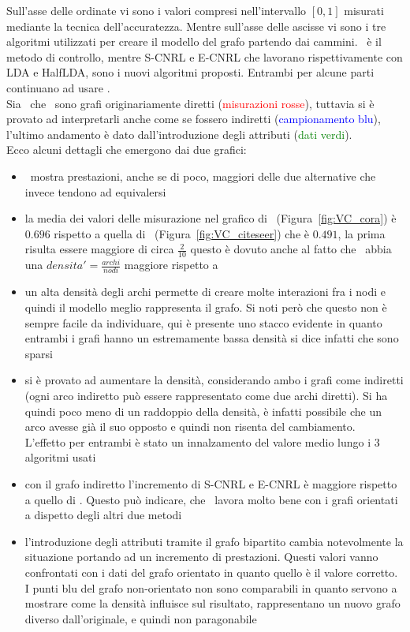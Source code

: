 %
Sull'asse delle ordinate vi sono i valori compresi nell'intervallo $[0, 1]$ misurati mediante la tecnica dell'accuratezza. Mentre sull'asse delle ascisse vi sono i tre algoritmi utilizzati per creare il modello del grafo partendo dai cammini. \wv\ è il metodo di controllo, mentre S-CNRL e E-CNRL che lavorano rispettivamente con LDA e HalfLDA, sono i nuovi algoritmi proposti. Entrambi per alcune parti continuano ad usare \wv.\\
Sia \cora\ che \citeseer\ sono grafi originariamente diretti (\textcolor{red}{misurazioni rosse}), tuttavia si è provato ad interpretarli anche come se fossero indiretti (\textcolor{blue}{campionamento blu}), l'ultimo andamento è dato dall'introduzione degli attributi (\textcolor{green}{dati verdi}).\\
Ecco alcuni dettagli che emergono dai due grafici:
\begin{itemize}
	\item \wv\ mostra prestazioni, anche se di poco, maggiori delle due alternative che invece tendono ad equivalersi
	\item la media dei valori delle misurazione nel grafico di \cora\ (Figura~\ref{fig:VC_cora}) è $0.696$ rispetto a quella di \citeseer\ (Figura~\ref{fig:VC_citeseer}) che è $0.491$, la prima risulta essere maggiore di circa $ \frac{2}{10}$ questo è dovuto anche al fatto che \cora\ abbia una $ densita' = \frac{archi}{nodi}$ maggiore rispetto a \citeseer
	\item un alta densità degli archi permette di creare molte interazioni fra i nodi e quindi il modello meglio rappresenta il grafo. Si noti però che questo non è sempre facile da individuare, qui è presente uno stacco evidente in quanto entrambi i grafi hanno un estremamente bassa densità si dice infatti che sono sparsi
	\item si è provato ad aumentare la densità, considerando ambo i grafi come indiretti (ogni arco indiretto può essere rappresentato come due archi diretti). Si ha quindi poco meno di un raddoppio della densità, è infatti possibile che un arco avesse già il suo opposto e quindi non risenta del cambiamento.\\
	L'effetto per entrambi è stato un innalzamento del valore medio lungo i 3 algoritmi usati
	\item con il grafo indiretto l'incremento di S-CNRL e E-CNRL è maggiore rispetto a quello di \wv . Questo può indicare, che \wv\ lavora molto bene con i grafi orientati a dispetto degli altri due metodi
	\item l'introduzione degli attributi tramite il grafo bipartito cambia notevolmente la situazione portando ad un incremento di prestazioni. Questi valori vanno confrontati con i dati del grafo orientato in quanto quello è il valore corretto. I punti blu del grafo non-orientato non sono comparabili in quanto servono a mostrare come la densità influisce sul risultato, rappresentano un nuovo grafo diverso dall'originale, e quindi non paragonabile
\end{itemize}
%

